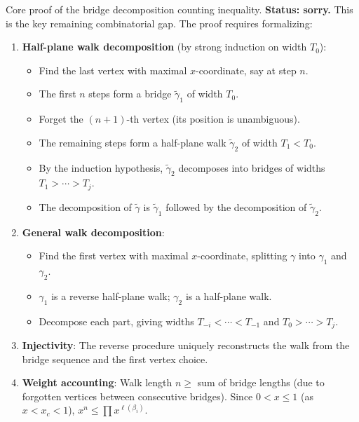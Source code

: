 \begin{theorem}\label{thm:bridge_decomp_inj_proof}
  Core proof of the bridge decomposition counting inequality.
  \textbf{Status: sorry.} This is the key remaining combinatorial gap.
  The proof requires formalizing:
  \begin{enumerate}
  \item \textbf{Half-plane walk decomposition} (by strong induction on width $T_0$):
    \begin{itemize}
    \item Find the last vertex with maximal $x$-coordinate, say at step $n$.
    \item The first $n$ steps form a bridge $\tilde{\gamma}_1$ of width $T_0$.
    \item Forget the $(n{+}1)$-th vertex (its position is unambiguous).
    \item The remaining steps form a half-plane walk $\tilde{\gamma}_2$ of width $T_1 < T_0$.
    \item By the induction hypothesis, $\tilde{\gamma}_2$ decomposes into bridges of widths $T_1 > \cdots > T_j$.
    \item The decomposition of $\tilde{\gamma}$ is $\tilde{\gamma}_1$ followed by the decomposition of $\tilde{\gamma}_2$.
    \end{itemize}
  \item \textbf{General walk decomposition}:
    \begin{itemize}
    \item Find the first vertex with maximal $x$-coordinate, splitting $\gamma$ into $\gamma_1$ and $\gamma_2$.
    \item $\gamma_1$ is a reverse half-plane walk; $\gamma_2$ is a half-plane walk.
    \item Decompose each part, giving widths $T_{-i} < \cdots < T_{-1}$ and $T_0 > \cdots > T_j$.
    \end{itemize}
  \item \textbf{Injectivity}: The reverse procedure uniquely reconstructs the walk from the bridge
    sequence and the first vertex choice.
  \item \textbf{Weight accounting}: Walk length $n \geq$ sum of bridge lengths (due to forgotten
    vertices between consecutive bridges). Since $0 < x \leq 1$ (as $x < x_c < 1$),
    $x^n \leq \prod x^{\ell(\beta_i)}$.
  \end{enumerate}
\end{theorem}


